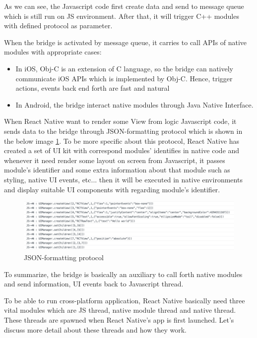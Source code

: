 As we can see, the Javascript code first create data and send to message queue which is still run on JS environment. After that, it will trigger C++ modules with defined protocol as parameter.

When the bridge is activated by message queue, it carries to call APIs of native modules with appropriate cases:

\begin{itemize}
\item In iOS, Obj-C is an extension of C language, so the bridge can natively communicate iOS APIs which is implemented by Obj-C. Hence, trigger actions, events back end forth are fast and natural
\item In Android, the bridge interact native modules through Java Native Interface. 
\end{itemize}

When React Native want to render some View from logic Javascript code, it sends data to the bridge through JSON-formatting protocol which is shown in the below image \ref{fig:RN-json-message}. To be more specific about this protocol, React Native has created a set of UI kit with correspond modules' identifies in native code and whenever it need render some layout on screen from Javascript, it passes module's identifier and some extra information about that module such as styling, native UI events, etc... then it will be executed in native environments and display suitable UI components with regarding module's identifier.
	
\begin{figure}[!h]
   	\centering
    	\includegraphics[scale=0.4]{Picture/mobile/RN-json-message.png}
    	\caption{JSON-formatting protocol}
	\label{fig:RN-json-message}
\end{figure}
	
To summarize, the bridge is basically an auxiliary to call forth native modules and send information, UI events back to Javascript thread. 

To be able to run cross-platform application, React Native basically need three vital modules which are JS thread, native module thread and native thread. These threads are spawned when React Native's app is first launched. Let's discuss more detail about these threads and how they work. 

